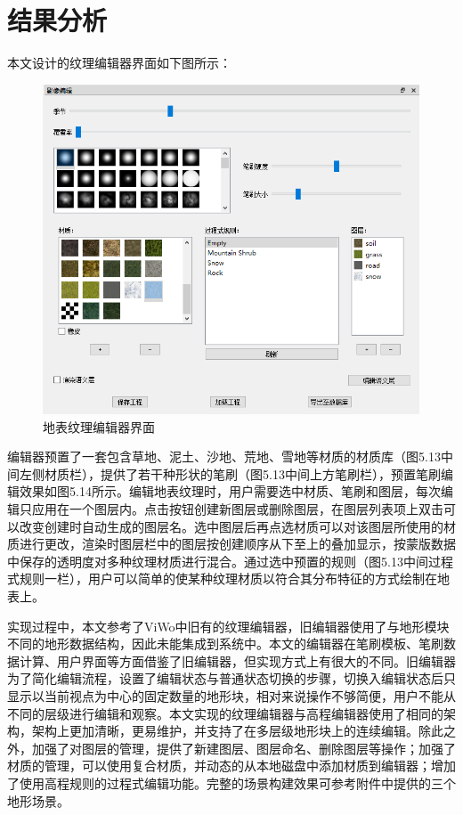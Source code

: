 \section{结果分析}
本文设计的纹理编辑器界面如下图所示：\par
\begin{figure}[htb]
    \centering
    \includegraphics[height=9.8cm ,width=11.2cm]{figures/maskinterface.PNG}
  \caption{地表纹理编辑器界面}
  \end{figure}
编辑器预置了一套包含草地、泥土、沙地、荒地、雪地等材质的材质库（图5.13中间左侧材质栏），提供了若干种形状的笔刷（图5.13中间上方笔刷栏），预置笔刷编辑效果如图5.14所示。编辑地表纹理时，用户需要选中材质、笔刷和图层，每次编辑只应用在一个图层内。点击按钮创建新图层或删除图层，在图层列表项上双击可以改变创建时自动生成的图层名。选中图层后再点选材质可以对该图层所使用的材质进行更改，渲染时图层栏中的图层按创建顺序从下至上的叠加显示，按蒙版数据中保存的透明度对多种纹理材质进行混合。通过选中预置的规则（图5.13中间过程式规则一栏），用户可以简单的使某种纹理材质以符合其分布特征的方式绘制在地表上。\par
实现过程中，本文参考了ViWo中旧有的纹理编辑器，旧编辑器使用了与地形模块不同的地形数据结构，因此未能集成到系统中。本文的编辑器在笔刷模板、笔刷数据计算、用户界面等方面借鉴了旧编辑器，但实现方式上有很大的不同。旧编辑器为了简化编辑流程，设置了编辑状态与普通状态切换的步骤，切换入编辑状态后只显示以当前视点为中心的固定数量的地形块，相对来说操作不够简便，用户不能从不同的层级进行编辑和观察。本文实现的纹理编辑器与高程编辑器使用了相同的架构，架构上更加清晰，更易维护，并支持了在多层级地形块上的连续编辑。除此之外，加强了对图层的管理，提供了新建图层、图层命名、删除图层等操作；加强了材质的管理，可以使用复合材质，并动态的从本地磁盘中添加材质到编辑器；增加了使用高程规则的过程式编辑功能。完整的场景构建效果可参考附件中提供的三个地形场景。\par

